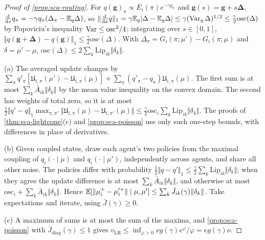 \begin{proof}[Proof of \cref{prop:sca-routing}]
For $q(\mathbf g)_\pi\propto E_i(\pi)e^{-\gamma g_\pi}$ and $\mathbf g(s)=\mathbf g+s\boldsymbol\Delta$, $\frac{\mathrm d}{\mathrm ds}q_\pi=-\gamma q_\pi(\Delta_\pi-\mathbb{E}_q\Delta)$, so $\Vert\frac{\mathrm d}{\mathrm ds}q\Vert_1=\gamma\mathbb{E}_q|\Delta-\mathbb{E}_q\Delta|\le\gamma(\operatorname{Var}_q\Delta)^{1/2}\le\frac\gamma2\mathrm{osc}(\Delta)$ by Popoviciu's inequality $\operatorname{Var}\le\mathrm{osc}^2/4$; integrating over $s\in[0,1]$, $\Vert q(\mathbf g+\boldsymbol\Delta)-q(\mathbf g)\Vert_1\le\frac\gamma2\mathrm{osc}(\Delta)$. With $\Delta_\pi=G_i(\pi;\mu')-G_i(\pi;\mu)$ and $\delta=\mu'-\mu$, $\mathrm{osc}(\Delta)\le2\sum_k\mathrm{Lip}_{ik}\Vert\delta_k\Vert$.

(a) The averaged update changes by $\sum_\pi q'_\pi[\mathfrak U_{i,\pi}(\mu')-\mathfrak U_{i,\pi}(\mu)]+\sum_\pi(q'_\pi-q_\pi)\mathfrak U_{i,\pi}(\mu)$. The first sum is at most $\sum_k\bar A_{ik}\Vert\delta_k\Vert$ by the mean value inequality on the convex domain. The second has weights of total zero, so it is at most $\frac12\Vert q'-q\Vert_1\max_{\pi,\pi'}\Vert\mathfrak U_{i,\pi}(\mu)-\mathfrak U_{i,\pi'}(\mu)\Vert\le\frac\gamma2\mathrm{osc}_i\sum_k\mathrm{Lip}_{ik}\Vert\delta_k\Vert$. The proofs of \cref{thm:sca-lightcone}(c) and \cref{prop:sca-poisson} use only such one-step bounds, with differences in place of derivatives.

(b) Given coupled states, draw each agent's two policies from the maximal coupling of $q_i(\cdot\mid\mu)$ and $q_i(\cdot\mid\mu')$, independently across agents, and share all other noise. The policies differ with probability $\frac12\Vert q-q'\Vert_1\le\frac\gamma2\sum_k\mathrm{Lip}_{ik}\Vert\delta_k\Vert$; when they agree the update difference is at most $\sum_k\bar A_{ik}\Vert\delta_k\Vert$, and otherwise at most $\mathrm{osc}_i+\sum_k\bar A_{ik}\Vert\delta_k\Vert$. Hence $\mathbb{E}[\Vert\mu_i^+-\mu_i'^+\Vert\mid\mu,\mu']\le\sum_k\bar J_{ik}(\gamma)\Vert\delta_k\Vert$. Take expectations and iterate, using $\bar J(\gamma)\ge0$.

(c) A maximum of sums is at most the sum of the maxima, and \cref{prop:sca-poisson} with $\bar J_{\mathrm{diag}}(\gamma)\le1$ gives $v_{\mathrm{LR}}\le\inf_{\varphi>0}\nu g(\gamma)e^\varphi/\varphi=eg(\gamma)\nu$.


\end{proof}

